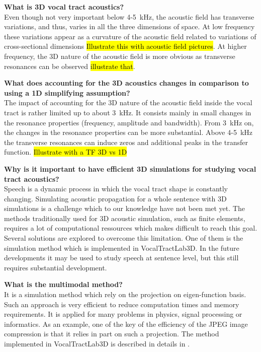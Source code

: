 \documentclass[]{article}
\begin{document}
	\textbf{What is 3D vocal tract acoustics?}\\
	Even though not very important below 4-5~kHz, 
	the acoustic field has transverse variations, and thus, varies in
	all the three dimensions of space. At low frequency these variations
	appear as a curvature of the acoustic field related to variations
	of cross-sectional dimensions \hl{Illustrate this with acoustic field pictures}. At higher frequency, the 3D nature of the acoustic field is more obvious as transverse resonances can be observed
	\hl{illustrate that}.
	
	\textbf{What does accounting for the 3D acoustics changes in comparison to using a 1D simplifying assumption?}\\
	The impact of accounting for the 3D nature of the acoustic field 
	inside the vocal tract is rather limited up to about 3~kHz. 
	It consists mainly in small changes in the resonance properties
	(frequency, amplitude and bandwidth). From 3~kHz on, the changes 
	in the resonance properties can be more substantial. Above 
	4-5~kHz the transverse resonances can induce zeros and additional 
	peaks in the transfer function. \hl{Illustrate with a TF 3D vs 1D}
	
	\textbf{Why is it important to have efficient 3D simulations for studying 
		vocal tract acoustics?}\\
	Speech is a dynamic process in which the vocal tract shape is constantly changing.
	Simulating acoustic propagation for a whole sentence with 3D simulations is a challenge 
	which to our knowledge have not been met yet. 
	The methods traditionally used for 3D acoustic simulation, such as finite elements,
	requires a lot of computational ressources which makes difficult to reach this goal.
	Several solutions are explored to overcome this limitation. 
	One of them is the simulation method which is implemented in VocalTractLab3D.
	In the future developments it may be used to study speech at sentence level, but this 
	still requires substantial development.
	
	\textbf{What is the multimodal method?}\\
	It is a simulation method which rely on the projection on eigen-function basis. 
	Such an approach is very efficient to reduce computation times and memory requirements.
	It is applied for many problems in physics, signal processing or informatics.
	As an example, one of the key of the efficiency of the JPEG image compression is that
	it relies in part on such a projection. The method implemented in VocalTractLab3D 
	is described in details in \textcite{blandin2022efficient}.
	
\end{document}
